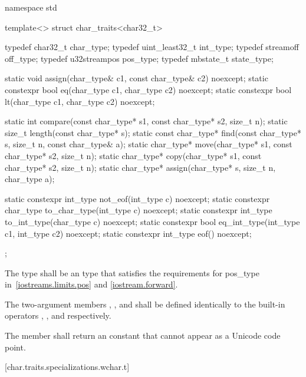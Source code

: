 %
\begin{codeblock}
namespace std {
  template<> struct char_traits<char32_t> {
    typedef char32_t        char_type;
    typedef uint_least32_t  int_type;
    typedef streamoff       off_type;
    typedef u32streampos    pos_type;
    typedef mbstate_t       state_type;

    static void assign(char_type& c1, const char_type& c2) noexcept;
    static constexpr bool eq(char_type c1, char_type c2) noexcept;
    static constexpr bool lt(char_type c1, char_type c2) noexcept;

    static int compare(const char_type* s1, const char_type* s2, size_t n);
    static size_t length(const char_type* s);
    static const char_type* find(const char_type* s, size_t n,
                 const char_type& a);
    static char_type* move(char_type* s1, const char_type* s2, size_t n);
    static char_type* copy(char_type* s1, const char_type* s2, size_t n);
    static char_type* assign(char_type* s, size_t n, char_type a);

    static constexpr int_type not_eof(int_type c) noexcept;
    static constexpr char_type to_char_type(int_type c) noexcept;
    static constexpr int_type to_int_type(char_type c) noexcept;
    static constexpr bool eq_int_type(int_type c1, int_type c2) noexcept;
    static constexpr int_type eof() noexcept;
  };
}
\end{codeblock}

\pnum
The type
shall be an  type that satisfies the requirements
for pos_type in~\ref{iostreams.limits.pos} and \ref{iostream.forward}.

\pnum
The two-argument members ,
, and  shall be defined identically to
the built-in operators \tcode{=}, \tcode{==}, and
\tcode{<} respectively.

\pnum
The member  shall return an
 constant that cannot appear as a Unicode
code point.

[char.traits.specializations.wchar.t]{}


